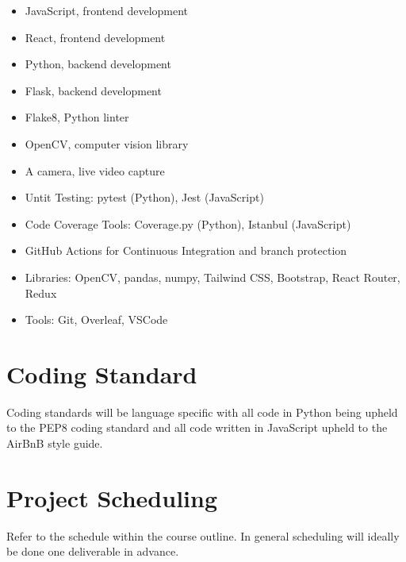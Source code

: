 \documentclass{article}
\begin{document}
\begin{itemize}
\item JavaScript, frontend development
\item React, frontend development
\item Python, backend development
\item Flask, backend development
\item Flake8, Python linter
\item OpenCV, computer vision library
\item A camera, live video capture
\item Untit Testing: pytest (Python), Jest (JavaScript)
\item Code Coverage Tools: Coverage.py (Python), Istanbul (JavaScript)
\item GitHub Actions for Continuous Integration and branch protection
\item Libraries: OpenCV, pandas, numpy, Tailwind CSS, Bootstrap, React Router, Redux
\item Tools: Git, Overleaf, VSCode
\end{itemize}

\section{Coding Standard}

Coding standards will be language specific with all code in Python being upheld to the PEP8 coding standard and all code written in JavaScript upheld to the AirBnB style guide.

\section{Project Scheduling}

Refer to the schedule within the course outline. In general scheduling will ideally be done one deliverable in advance.

\end{document}
